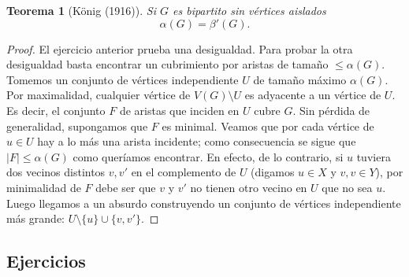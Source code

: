 \documentclass[12pt]{report}
\theoremstyle{plain}
\newtheorem{theorem}{Teorema}[section]
\theoremstyle{definition}
\newcommand{\abs}[1]{\left \vert #1 \right \vert}
\begin{document}
\begin{theorem}[König (1916)]
Si $G$ es bipartito sin vértices aislados
\[
    \boxed{\alpha (G) = \beta ' (G) .}
\]
\end{theorem}
\begin{proof}
El ejercicio anterior prueba una desigualdad. Para probar la otra desigualdad basta encontrar un cubrimiento por aristas de tamaño $ \leq \alpha (G)$. Tomemos un conjunto de vértices independiente $U$ de tamaño máximo $\alpha (G)$. Por maximalidad, cualquier vértice de $V(G) \setminus U$ es adyacente a un vértice de $U$. Es decir, el conjunto $F$ de aristas que inciden en $U$ cubre $G$. Sin pérdida de generalidad, supongamos que $F$ es minimal. Veamos que por cada vértice de $u \in U$ hay a lo más una arista incidente; como consecuencia se sigue que $\abs F \leq \alpha (G)$ como queríamos encontrar. En efecto, de lo contrario, si $u$ tuviera dos vecinos distintos $v,v'$ en el complemento de $U$ (digamos $u \in X$ y $v,v \in Y$), por minimalidad de $F$ debe ser que $v$ y $v'$ no tienen otro vecino en $U$ que no sea $u$. Luego llegamos a un absurdo construyendo un conjunto de vértices independiente más grande: $U\setminus \{u\} \cup \{v,v'\}$.
\end{proof}




\subsection{Ejercicios}
\end{document}
